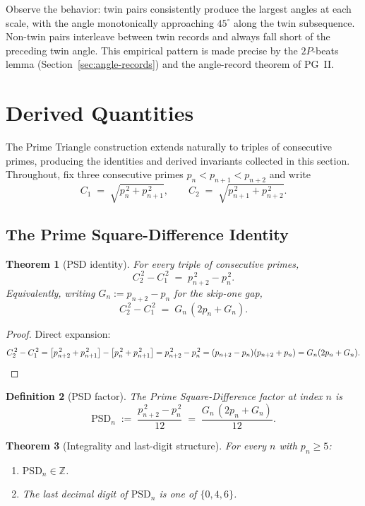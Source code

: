\documentclass[11pt]{article}
\newtheorem{theorem}{Theorem}
\newtheorem{definition}[theorem]{Definition}
\begin{document}
Observe the behavior: twin pairs consistently produce the largest
angles at each scale, with the angle monotonically approaching
$45^\circ$ along the twin subsequence. Non-twin pairs interleave
between twin records and always fall short of the preceding twin
angle. This empirical pattern is made precise by the $2P$-beats lemma
(Section~\ref{sec:angle-records}) and the angle-record theorem of
PG~II.

\section{Derived Quantities}

The Prime Triangle construction extends naturally to triples of
consecutive primes, producing the identities and derived invariants
collected in this section. Throughout, fix three consecutive primes
$p_n < p_{n+1} < p_{n+2}$ and write
\[
C_1 \;=\; \sqrt{p_n^{\,2} + p_{n+1}^{\,2}},
\qquad
C_2 \;=\; \sqrt{p_{n+1}^{\,2} + p_{n+2}^{\,2}}.
\]

\subsection{The Prime Square-Difference Identity}

\begin{theorem}[PSD identity]\label{thm:psd}
For every triple of consecutive primes,
\[
C_2^{\,2} - C_1^{\,2} \;=\; p_{n+2}^{\,2} - p_n^{\,2}.
\]
Equivalently, writing $G_n := p_{n+2} - p_n$ for the skip-one gap,
\[
C_2^{\,2} - C_1^{\,2} \;=\; G_n\,(2 p_n + G_n).
\]
\end{theorem}

\begin{proof}
Direct expansion:
\[
C_2^{\,2} - C_1^{\,2}
= \big[p_{n+2}^{\,2} + p_{n+1}^{\,2}\big]
- \big[p_n^{\,2} + p_{n+1}^{\,2}\big]
= p_{n+2}^{\,2} - p_n^{\,2}
= (p_{n+2} - p_n)(p_{n+2} + p_n)
= G_n(2p_n + G_n). \qedhere
\]
\end{proof}

\begin{definition}[PSD factor]
The \emph{Prime Square-Difference factor} at index $n$ is
\[
\mathrm{PSD}_n \;:=\; \frac{p_{n+2}^{\,2} - p_n^{\,2}}{12}
\;=\; \frac{G_n\,(2 p_n + G_n)}{12}.
\]
\end{definition}

\begin{theorem}[Integrality and last-digit structure]\label{thm:psd-int}
For every $n$ with $p_n \ge 5$:
\begin{enumerate}
\item[(i)] $\mathrm{PSD}_n \in \mathbb{Z}$.
\item[(ii)] The last decimal digit of $\mathrm{PSD}_n$ is one of
$\{0, 4, 6\}$.
\end{enumerate}
\end{theorem}
\end{document}
